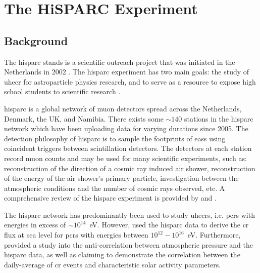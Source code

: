 \section{The HiSPARC Experiment}\label{sec:intro_HiSPARC}

\subsection{Background}

The \gls{hisparc} stands is a scientific outreach project that was initiated in the Netherlands in 2002 \citep{bartels_hisparc_2012}. The \gls{hisparc} experiment has two main goals: the study of \gls{uhecr} for astroparticle physics research, and to serve as a resource to expose high school students to scientific research \citep{bartels_hisparc_2012}.

\gls{hisparc} is a global network of muon detectors spread across the Netherlands, Denmark, the UK, and Namibia. There exists some $\sim140$ stations in the \gls{hisparc} network \citep{van_dam_hisparc_2020} which have been uploading data for varying durations since 2005. The detection philosophy of \gls{hisparc} is to sample the footprints of \glspl{eas} using coincident triggers between scintillation detectors. The detectors at each station record muon counts and may be used for many scientific experiments, such as: reconstruction of the direction of a cosmic ray induced air shower, reconstruction of the energy of the air shower's primary particle, investigation between the atmospheric conditions and the number of cosmic rays observed, etc. A comprehensive review of the \gls{hisparc} experiment is provided by \citet{fokkema_hisparc_2012} and \citet{van_dam_hisparc_2020}.

The \gls{hisparc} network has predominantly been used to study \glspl{uhecr}, i.e. \glspl{pcr} with energies in excess of $\sim10^{14}$~eV. However, \citet{van_dam_probing_2020} used the \gls{hisparc} data to derive the \gls{cr} flux at sea level for \glspl{pcr} with energies between $10^{12}-10^{16}$~eV. Furthermore, \citet{fan_analysis_2018} provided a study into the anti-correlation between atmospheric pressure and the \gls{hisparc} data, as well as claiming to demonstrate the correlation between the daily-average of \gls{cr} events and characteristic solar activity parameters.



